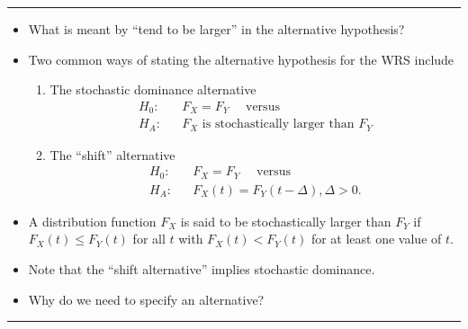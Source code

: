 \documentclass[]{book}
\providecommand{\tightlist}{%
  \setlength{\itemsep}{0pt}\setlength{\parskip}{0pt}}
\begin{document}
\begin{center}\rule{0.5\linewidth}{\linethickness}\end{center}

\begin{itemize}
\item
  What is meant by ``tend to be larger'' in the alternative hypothesis?
\item
  Two common ways of stating the alternative hypothesis for the WRS include

  \begin{enumerate}
  \def\labelenumi{\arabic{enumi}.}
  \tightlist
  \item
    The stochastic dominance alternative
    \begin{eqnarray}
    H_{0}: & & F_{X} = F_{Y} \quad \textrm{ versus } \nonumber \\
    H_{A}: & & F_{X} \textrm{ is stochastically larger than } F_{Y} 
    \label{eq:stochasticlarger-formulation}
    \end{eqnarray}
  \item
    The ``shift'' alternative
    \begin{eqnarray}
    H_{0}: & & F_{X} = F_{Y} \quad \textrm{ versus } \nonumber \\
    H_{A}: & & F_{X}(t) = F_{Y}(t - \Delta), \Delta > 0.
    \label{eq:shift-formulation}
    \end{eqnarray}
  \end{enumerate}
\item
  A distribution function \(F_{X}\) is said to be stochastically larger than
  \(F_{Y}\) if \(F_{X}(t) \leq F_{Y}(t)\) for all \(t\) with \(F_{X}(t) < F_{Y}(t)\)
  for at least one value of \(t\).
\item
  Note that the ``shift alternative'' implies stochastic dominance.
\item
  Why do we need to specify an alternative?
\end{itemize}

\begin{center}\rule{0.5\linewidth}{\linethickness}\end{center}
\end{document}

